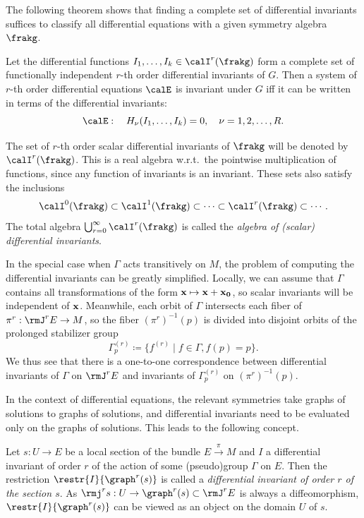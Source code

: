 The following theorem shows that finding a complete set of differential invariants suffices to classify all differential equations with a given symmetry algebra $\frakg$.

\begin{thm}
    Let the differential functions $I_1,\ldots,I_k\in\calI^r(\frakg)$ form a complete set of functionally independent $r$-th order differential invariants of $G$. Then a system of $r$-th order differential equations $\calE$ is invariant under $G$ iff it can be written in terms of the differential invariants:
    \[\calE:\quad H_\nu(I_1,\ldots,I_k)=0,\quad \nu=1,2,\ldots,R.\]
\end{thm}




The set of $r$-th order scalar differential invariants of $\frakg$ will be denoted by $\calI^r(\frakg)$. This is a real algebra w.r.t.\ the pointwise multiplication of functions, since any function of invariants is an invariant. These sets also satisfy the inclusions 
\[\calI^0(\frakg)\subset\calI^1(\frakg)\subset\cdots\subset\calI^r(\frakg)\subset\cdots.\]
The total algebra $\bigcup_{r=0}^\infty \calI^r(\frakg)$ is called the \emph{algebra of (scalar) differential invariants}.


\begin{rem}
    In the special case when $\Gamma$ acts transitively on $M$, the problem of computing the differential invariants can be greatly simplified. Locally, we can assume that $\Gamma$ contains all transformations of the form $\bf{x}\mapsto \bf{x}+\bf{x}_0$, so scalar invariants will be independent of $\bf{x}$. Meanwhile, each orbit of $\Gamma$ intersects each fiber of $\pi^r:\rmJ^r E\to M$, so the fiber $(\pi^r)^{-1}(p)$ is divided into disjoint orbits of the prolonged stabilizer group 
    \[\Gamma^{(r)}_p\coloneqq \{f^{(r)}\mid f\in\Gamma,f(p)=p\}.\]
    We thus see that there is a one-to-one correspondence between differential invariants of $\Gamma$ on $\rmJ^r E$ and invariants of $\Gamma^{(r)}_p$ on $(\pi^r)^{-1}(p)$. 
\end{rem}


In the context of differential equations, the relevant symmetries take graphs of solutions to graphs of solutions, and differential invariants need to be evaluated only on the graphs of solutions. This leads to the following concept.

\begin{defn}
    Let $s:U\to E$ be a local section of the bundle $E\overset{\pi}{\to}M$ and $I$ a differential invariant of order $r$ of the action of some (pseudo)group $\Gamma$ on $E$. Then the restriction $\restr{I}{\graph^{r}(s)}$ is called a \emph{differential invariant of order $r$ of the section $s$}. As $\rmj^r s:U\to \graph^{r}(s)\subset\rmJ^rE$ is always a diffeomorphism, $\restr{I}{\graph^{r}(s)}$ can be viewed as an object on the domain $U$ of $s$.
\end{defn}

